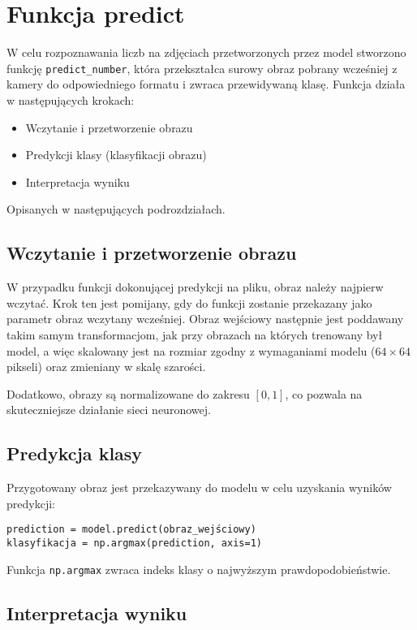 \section{Funkcja predict}

W celu rozpoznawania liczb na zdjęciach przetworzonych przez model stworzono funkcję \texttt{predict\_number},
która przekształca surowy obraz pobrany wcześniej z kamery do odpowiedniego formatu i zwraca przewidywaną klasę.
Funkcja działa w następujących krokach:
\begin{itemize}
    \item Wczytanie i przetworzenie obrazu
    \item Predykcji klasy (klasyfikacji obrazu)
    \item Interpretacja wyniku
\end{itemize}
Opisanych w następujących podrozdziałach.

\subsection{Wczytanie i przetworzenie obrazu}

W przypadku funkcji dokonującej predykcji na pliku, obraz należy najpierw wczytać.
Krok ten jest pomijany, gdy do funkcji zostanie przekazany jako parametr obraz wczytany wcześniej.
Obraz wejściowy następnie jest poddawany takim samym transformacjom, jak przy obrazach na których trenowany był model,
a więc skalowany jest na rozmiar zgodny z wymaganiami modelu ($64 \times 64$ pikseli) oraz zmieniany w skalę szarości.

Dodatkowo, obrazy są normalizowane do zakresu $[0, 1]$, co pozwala na skuteczniejsze działanie sieci neuronowej.

\subsection{Predykcja klasy}

Przygotowany obraz jest przekazywany do modelu w celu uzyskania wyników predykcji:

\begin{verbatim}
prediction = model.predict(obraz_wejściowy)
klasyfikacja = np.argmax(prediction, axis=1)
\end{verbatim}

Funkcja \texttt{np.argmax} zwraca indeks klasy o najwyższym prawdopodobieństwie.

\subsection{Interpretacja wyniku}

